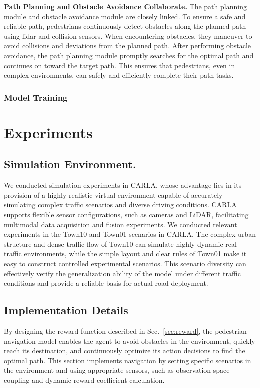 \documentclass[lettersize,journal]{IEEEtran}
\begin{document}
\textbf{Path Planning and Obstacle Avoidance Collaborate.}
%
The path planning module and obstacle avoidance module are closely linked. 
To ensure a safe and reliable path, pedestrians continuously detect obstacles along the planned path using lidar and collision sensors. 
When encountering obstacles, they maneuver to avoid collisions and deviations from the planned path. 
After performing obstacle avoidance, the path planning module promptly searches for the optimal path and continues on toward the target path. 
This ensures that pedestrians, even in complex environments, can safely and efficiently complete their path tasks.


\subsubsection{Model Training}



\section{Experiments}


\subsection{Simulation Environment.}

We conducted simulation experiments in CARLA, whose advantage lies in its provision of a highly realistic virtual environment capable of accurately simulating complex traffic scenarios and diverse driving conditions. 
CARLA supports flexible sensor configurations, such as cameras and LiDAR, facilitating multimodal data acquisition and fusion experiments\cite{Alpher22e}. 
We conducted relevant experiments in the Town10 and Town01 scenarios in CARLA.
The complex urban structure and dense traffic flow of Town10 can simulate highly dynamic real traffic environments, while the simple layout and clear rules of Town01 make it easy to construct controlled experimental scenarios.
This scenario diversity can effectively verify the generalization ability of the model under different traffic conditions and provide a reliable basis for actual road deployment.

\subsection{Implementation Details}


By designing the reward function described in Sec.~\ref{sec:reward}, the pedestrian navigation model enables the agent to avoid obstacles in the environment, quickly reach its destination, and continuously optimize its action decisions to find the optimal path. 
This section implements navigation by setting specific scenarios in the environment and using appropriate sensors, such as observation space coupling and dynamic reward coefficient calculation.
\end{document}
